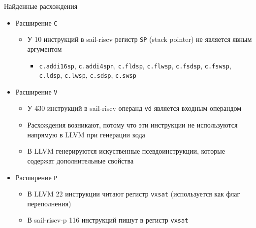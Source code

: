\documentclass
  [ russian
  , aspectratio=169 %
  ] {beamer}
\begin{document}
\begin{frame}{Найденные расхождения}
    \begin{itemize}
        \item Расширение \texttt{C}
              \begin{itemize}
                  \item У 10 инструкций в sail-riscv регистр \texttt{SP} (stack pointer) не является явным аргументом
                        \begin{itemize}
                            \item \texttt{c.addi16sp}, \texttt{c.addi4spn}, \texttt{c.fldsp}, \texttt{c.flwsp}, \texttt{c.fsdsp}, \texttt{c.fswsp}, \texttt{c.ldsp}, \texttt{c.lwsp}, \texttt{c.sdsp}, \texttt{c.swsp}
                        \end{itemize}
              \end{itemize}
        \item Расширение \texttt{V}
              \begin{itemize}
                  \item У 430 инструкций в sail-riscv операнд \texttt{vd} является входным операндом
                  \item Расхождения возникают, потому что эти инструкции не используются напрямую в LLVM при генерации кода
                  \item В LLVM генерируются искуственные псевдоинструкции, которые содержат дополнительные свойства
              \end{itemize}
        \item Расширение \texttt{P}
              \begin{itemize}
                  \item В LLVM 22 инструкции читают регистр \texttt{vxsat} (используется как флаг переполнения)
                  \item В sail-riscv-p 116 инструкций пишут в регистр \texttt{vxsat}
              \end{itemize}
    \end{itemize}

\end{frame}
\end{document}
